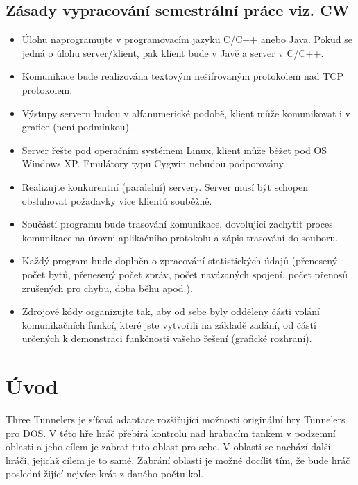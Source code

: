 \documentclass[12pt,a4paper]{article}
\let\oldsection\section
\renewcommand\section{\clearpage\oldsection}
\begin{document}
\subsection*{Zásady vypracování semestrální práce viz. CW}
\begin{itemize}
\setlength\itemsep{0em}
\item Úlohu naprogramujte v programovacím jazyku C/C++ anebo Java. Pokud se jedná o úlohu server/klient, pak klient bude v Javě a server v C/C++.

\item Komunikace bude realizována textovým nešifrovaným protokolem nad TCP protokolem.

\item Výstupy serveru budou v alfanumerické podobě, klient může komunikovat i v grafice (není podmínkou).

\item Server řešte pod operačním systémem Linux, klient může běžet pod OS Windows XP. Emulátory typu Cygwin nebudou podporovány.

\item Realizujte konkurentní (paralelní) servery. Server musí být schopen obsluhovat požadavky více klientů souběžně.

\item Součástí programu bude trasování komunikace, dovolující zachytit proces komunikace na úrovni aplikačního protokolu a zápis trasování do souboru.

\item Každý program bude doplněn o zpracování statistických údajů (přenesený počet bytů, přenesený počet zpráv, počet navázaných spojení, počet přenosů zrušených pro chybu, doba běhu apod.).

\item Zdrojové kódy organizujte tak, aby od sebe byly odděleny části volání komunikačních funkcí, které jste vytvořili na základě zadání, od částí určených k demonstraci funkčnosti vašeho řešení (grafické rozhraní).
\end{itemize}

\section{Úvod}
Three Tunnelers je síťová adaptace rozšiřující možnosti originální hry Tunnelers pro DOS. V této hře hráč přebírá kontrolu nad hrabacím tankem v podzemní oblasti a jeho cílem je zabrat tuto oblast pro sebe. V oblasti se nachází další hráči, jejichž cílem je to samé. Zabrání oblasti je možné docílit tím, že bude hráč poslední žijící nejvíce-krát z daného počtu kol.
\end{document}

